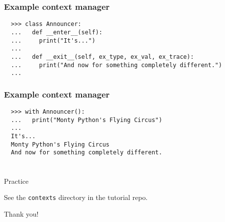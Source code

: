 \documentclass[aspectratio=169]{beamer}
\begin{document}
\begin{frame}[fragile]
  \frametitle{Example context manager}
  
  \begin{verbatim}
  >>> class Announcer:
  ...   def __enter__(self):
  ...     print("It's...")
  ...
  ...   def __exit__(self, ex_type, ex_val, ex_trace):
  ...     print("And now for something completely different.")
  ...
  \end{verbatim}
  
    
  \end{frame}

\begin{frame}[fragile]
  \frametitle{Example context manager}
  
  \begin{verbatim}
  >>> with Announcer():
  ...   print("Monty Python's Flying Circus")
  ...
  It's...
  Monty Python's Flying Circus
  And now for something completely different.  
  
  \end{verbatim}
  
    
  \end{frame}
 
\begin{frame}
  \frametitle{} 
   
   \centerline{\huge Practice} 
   \centerline{See the \texttt{contexts} directory in the tutorial repo.} 
   
   \bigbreak
   \centerline{\huge Thank you!} 
   \end{frame}
\end{document}
